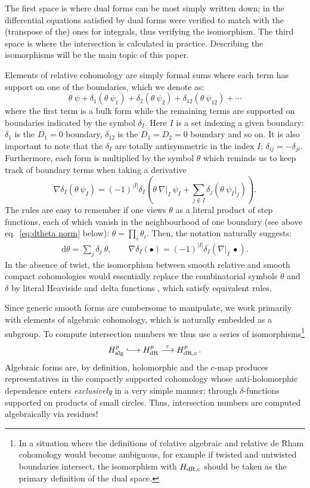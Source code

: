 \documentclass[11pt]{article}
\renewcommand{\d}{\text{d}}
\newcommand{\be}{\begin{equation}}
\newcommand{\ee}{\end{equation}}
\newcommand{\alg}{{\rm alg}}
\newcommand{\dr}{{\rm dR}}
\newcommand{\drc}{{\rm dR,c}}
\renewcommand{\th}{\theta}
\newcommand{\hooklongrightarrow}{\lhook\joinrel\longrightarrow}
\begin{document}
The first space is where dual forms can be most simply written down; in \cite{Caron-Huot:2021xqj} the differential equations
satisfied by dual forms were verified to match with the (transpose of the) ones for integrals, thus verifying the isomorphism. The third space is where the intersection  is calculated in practice.
Describing the isomorphisms will be the main topic of this paper.

Elements of relative cohomology are simply formal sums
where each term has support on one of the boundaries, which we denote as:
\be
 	\th\ \psi
 	+ \delta_{1}(\th\ \psi_1)
	+ \delta_{2}(\th\ \psi_2)
 	+ \delta_{12} (\th\ \psi_{12}) 
	+ \cdots 
	\label{delta notation}
\ee
where the first term is a bulk form while the remaining terms are supported on boundaries indicated by the symbol $\delta_I$. Here $I$ is a set indexing a given boundary: $\delta_1$ is the $D_1=0$ boundary, $\delta_{12}$ is the $D_1=D_2=0$ boundary and so on. It is also important to note that the $\delta_I$ are totally antisymmetric in the index $I$: $\delta_{ij} = -\delta_{ji}$. Furthermore, each form is multiplied by the symbol $\th$ which reminds us to keep track of boundary terms when taking a derivative 
\be \label{eq:boundary terms}
	\nabla \delta_I (\theta\ \psi_I) 
	= (-1)^{|I|} \delta_I \left(\theta\ \nabla\vert_I\ \psi_I + \sum_{j \notin I} \delta_j \left( \theta\ \psi_I\big|_{j} \right) \right).
\ee 
The rules are easy to remember if one views $\theta$ as a literal product of step functions, each of which
vanish in the neighbourhood of one boundary (see above eq.~\eqref{eq:dtheta norm} below): $\theta=\prod_i \theta_i$.
Then, the notation naturally suggests:
\begin{align} \label{eq: dtheta nabla delta}
	\d \theta  =  \sum_{j} \delta_j\ \theta, 
	\qquad 
	\nabla \delta_{I}(\bullet) = (-1)^{|I|} \delta_I(\nabla\vert_{I}\ \bullet).
\end{align}
In the absence of twist, the isomorphism between smooth relative and smooth compact cohomologies would essentially replace the combinatorial symbols $\th$ and $\delta$ by literal Heaviside and delta functions \cite{Caron-Huot:2021xqj}, which satisfy equivalent rules.


Since generic smooth forms are cumbersome to manipulate, we work primarily with elements of algebraic cohomology, which is naturally embedded as a subgroup. 
To compute intersection numbers we thus use a series of isomorphisms\footnote{In a situation where the definitions of relative algebraic and relative de Rham cohomology would become ambiguous, for example if twisted and untwisted boundaries intersect,
the isomorphism with $H_{\rm dR,c}$ should be taken as the primary definition of the dual space.}
\begin{equation*}
	H^p_\alg  
	\hooklongrightarrow
	H^p_\dr
	\overset{c}{\longrightarrow}       
	H^p_\drc                   \,.
\end{equation*}
Algebraic forms are, by definition, holomorphic and the $c$-map
produces representatives in the compactly supported cohomology whose anti-holomorphic dependence enters \emph{exclusively} in a very simple manner: through $\delta$-functions supported on products of small circles. Thus, intersection numbers are computed algebraically via residues!
\end{document}
